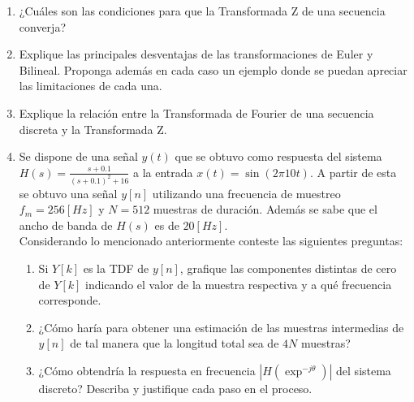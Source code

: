\documentclass[a4paper,10pt,spanish]{article}
\begin{document}
\begin{enumerate}
\item ¿Cuáles son las condiciones para que la Transformada Z de una secuencia converja?

\item Explique las principales desventajas de las transformaciones de Euler y Bilineal. Proponga además en cada caso un ejemplo donde se puedan apreciar las limitaciones de cada una.

\item Explique la relación entre la Transformada de Fourier de una secuencia discreta y la Transformada Z.

\item Se dispone de una señal $y(t)$ que se obtuvo como respuesta del sistema $H(s)=\frac{s+0.1}{(s+0.1)^{2}+16}$ a la entrada $x(t)=\sin(2\pi 10t)$. A partir de esta se obtuvo una señal $y[n]$ utilizando una frecuencia de muestreo $f_{m}=256[Hz]$ y $N=512$ muestras de duración. Además se sabe que el ancho de banda de $H(s)$ es de $20[Hz]$.\\
Considerando lo mencionado anteriormente conteste las siguientes preguntas:
	\begin{enumerate}
	\item Si $Y[k]$ es la TDF de $y[n]$, grafique las componentes distintas de cero de 	$Y[k]$ indicando el valor de la muestra respectiva y a qué frecuencia corresponde.
	\item ¿Cómo haría para obtener una estimación de las muestras intermedias de $y[n]		$ de tal manera que la longitud total sea de $4N$ muestras?
	\item ¿Cómo obtendría la respuesta en frecuencia $|H(\exp^{-j\theta})|$ del 			sistema discreto? Describa y justifique cada paso en el proceso.
	\end{enumerate}

\end{enumerate}
\end{document}
